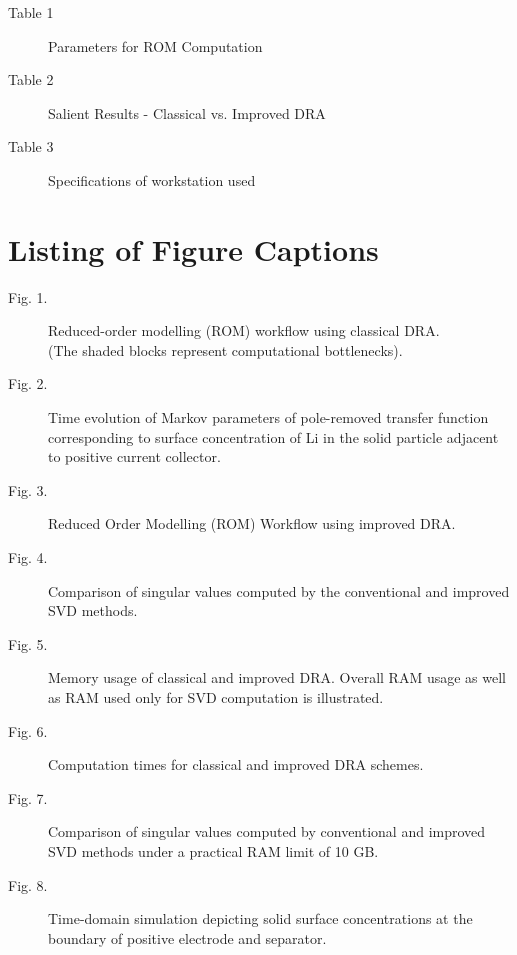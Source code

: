 \begin{description}
	\item[Table 1]   Parameters for ROM Computation\\
	\item[Table 2]   Salient Results - Classical vs. Improved DRA\\
	\item[Table 3]   Specifications of workstation used
\end{description}
\newpage
\section*{Listing of Figure Captions}

\begin{description}
	\item[Fig. 1.]   Reduced-order modelling (ROM) workflow using classical DRA.\\ (The shaded blocks represent computational bottlenecks).\\
	\item[Fig. 2.]   Time evolution of Markov parameters of pole-removed transfer function corresponding to surface concentration of Li in the solid particle adjacent to positive current collector.\\
	\item[Fig. 3.]   Reduced Order Modelling (ROM) Workflow using improved DRA.\\
	\item[Fig. 4.]   Comparison of singular values computed by the conventional and improved SVD methods.\\
	\item[Fig. 5.]	 Memory usage of classical and improved DRA. Overall RAM usage as well as RAM used only for SVD computation is illustrated.\\
	\item[Fig. 6.] 	 Computation times for classical and improved DRA schemes.\\
	\item[Fig. 7.]	 Comparison of singular values computed by conventional and improved SVD methods under a practical RAM limit of 10 GB.\\
	\item[Fig. 8.]	 Time-domain simulation depicting solid surface concentrations at the boundary of positive electrode and separator.\\
\end{description}

